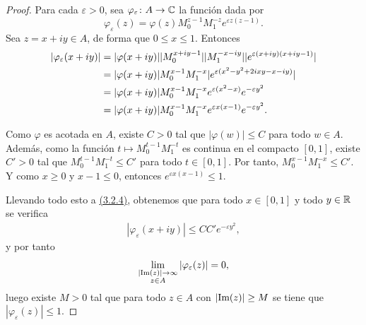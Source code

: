 \documentclass[a4paper, 12pt, oneside]{book}
\begin{document}
\begin{proof}
    Para cada $\varepsilon > 0$, sea $\varphi_\varepsilon \colon A \to \mathbb C$ la función dada por
    \[\varphi_\varepsilon(z) = \varphi(z)M_0^{z-1}M_1^{-z}e^{\varepsilon z(z-1)}.\]
    Sea $z = x+iy \in A$, de forma que $0 \leq x \leq 1$. Entonces
    \begin{align}\label{3.2.4}
    |\varphi_\varepsilon(x+iy)| &= |\varphi(x+iy)|| M_0^{x+iy-1}||M_1^{-x-iy}||e^{\varepsilon(x+iy)(x+iy-1)}| \notag \\
    &= |\varphi(x+iy)|M_0^{x-1}M_1^{-x}|e^{\varepsilon(x^2-y^2+2ixy-x-iy)}| \notag \\
    &= |\varphi(x+iy)|M_0^{x-1}M_1^{-x}e^{\varepsilon (x^2-x)}e^{-\varepsilon y^2} \notag \\
    &= |\varphi(x+iy)|M_0^{x-1}M_1^{-x}e^{\varepsilon x(x-1)}e^{-\varepsilon y^2}.
    \end{align} 

    Como $\varphi$ es acotada en $A$, existe $C > 0$ tal que $|\varphi(w)| \leq C$ para todo $w \in A$. Además, como la función $t \mapsto M_0^{t-1}M_1^{-t}$ es continua en el compacto $[0,1]$, existe $C'> 0$ tal que $M_0^{t-1}M_1^{-t} \leq C'$ para todo $t \in [0,1]$. Por tanto, $M_0^{x-1}M_1^{-x} \leq C'$. Y como $x \geq 0$ y $x-1 \leq 0$, entonces $e^{\varepsilon x(x-1)} \leq 1$. 
    
    Llevando todo esto a \hyperref[3.2.4]{\color{blue}(3.2.4)}, obtenemos que para todo $x \in [0,1]$ y todo $y \in \mathbb R$ se verifica
    \begin{align*}
        |\varphi_\varepsilon(x+iy)| \leq CC'e^{-\varepsilon y^2}, 
    \end{align*} 
    y por tanto
    \[\lim_{\substack{|\textup{Im}(z)| \to \infty \\ z \in A}} |\varphi_\varepsilon(z)| = 0,\]
    luego existe $M > 0$ tal que para todo $z \in A$ con $|\textup{Im}(z)| \geq M$ se tiene que $|\varphi_\varepsilon(z)| \leq 1$. 
    

\end{proof}
\end{document}
